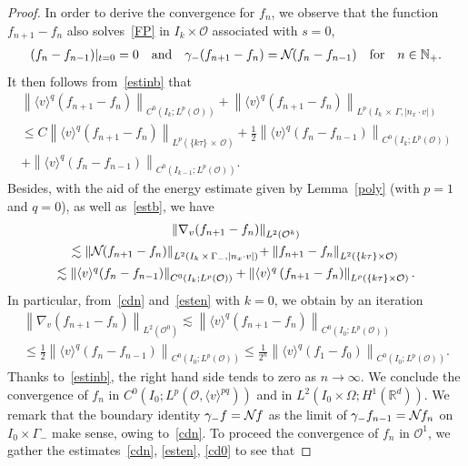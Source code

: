 \documentclass[AHL,Unicode,longabstracts,published]{cedram}
\newcommand*\N {\mathbb{N}}
\newcommand*\R {\mathbb{R}}
\newcommand*\NN {{\mathcal{N}\hspace{-.3mm}}}
\newcommand*\OO {\mathcal{O}}
\newcommand{\lv}{\langle v\rangle}
\begin{document}
\begin{proof}
In order to derive the convergence for $f_n$, we observe that the function $f_{n+1}-f_n$ also solves~\eqref{FP} in $I_k\times\OO$ associated with $s=0$,
\begin{align*}
(f_{n}-f_{n-1})|_{t=0}=0 \quad\text{and}\quad
\gamma_-(f_{n+1}-f_n)=\NN (f_{n}-f_{n-1})\quad\text{for}\quad n\in\N_+.
\end{align*}
It then follows from~\eqref{estinb} that
\begin{multline}\label{cdn}
\left\|\lv^{q}\left(f_{n+1}-f_{n}\right)\right\|_{C^0\left(I_k;L^p(\OO)\right)} + \left\|\lv^q \left(f_{n+1}-f_{n}\right)\right\|_{L^p\left(I_k\,\times\,\Gamma,|n_x\cdot v|\right)}\\
\le C\left\|\lv^{q}\left(f_{n+1}-f_{n}\right)\right\|_{L^p\left(\{k\tau\}\,\times\,\OO\right)} +\frac{1}{2}\left\|\lv^{q} \left(f_{n}-f_{n-1}\right)\right\|_{C^0\left(I_k;L^p(\OO)\right)}\\
+ \left\|\lv^{q} \left(f_{n}-f_{n-1}\right)\right\|_{C^0\left(I_{k-1};L^p(\OO)\right)}.
\end{multline}
Besides, with the aid of the energy estimate given by Lemma~\ref{poly} (with $p=1$ and $q=0$), as well as~\eqref{estb}, we have
\begin{multline}\label{esten}
\left\|\nabla_v(f_{n+1}-f_{n})\right\|_{L^2\left(\OO^k\right)} \\
\!\lesssim \left\|\NN(f_{n+1}-f_{n})\right\|_{L^2\left(I_k\,\times\,\Gamma_-,|n_x\cdot v|\right)}\! +\left\|f_{n+1}-f_{n}\right\|_{L^2(\{k\tau\}\times\OO)}\\
\lesssim \left\|\lv^q(f_{n}-f_{n-1})\right\|_{C^0\left(I_k;L^p(\OO)\right)} +\left\|\lv^{q}\left(f_{n+1}-f_{n}\right)\right \|_{L^p\left(\{k\tau\}\times\OO\right)}.
\end{multline}
In particular, from~\eqref{cdn} and~\eqref{esten} with $k=0$, we obtain by an iteration
\begin{multline}\label{cd0}
\left\|\nabla_v(f_{n+1}-f_{n})\right\|_{L^2(\OO^0)}
\lesssim \left\|\lv^{q}(f_{n+1}-f_{n})\right\|_{C^0\left(I_0;L^p(\OO)\right)} \\
\le\frac{1}{2}\left\|\lv^{q} (f_{n}-f_{n-1})\right\|_{C^0\left(I_0;L^p(\OO)\right)}
\le\frac{1}{2^n}\left\|\lv^{q} (f_{1}-f_{0})\right\|_{C^0(I_0;L^p(\OO))}.
\end{multline}
Thanks to~\eqref{estinb}, the right hand side tends to zero as $n\rightarrow\infty$. We conclude the convergence of $f_n$ in $C^0(I_0;L^p(\OO,\lv^{pq}))$ and in $L^2(I_0\times\Omega;H^1(\R^d))$. We remark that the boundary identity $\gamma_-f=\NN f$ as the limit of $\gamma_-f_{n-1}=\NN f_n$ on $I_0\times\Gamma_-$ make sense, owing to~\eqref{cdn}. To proceed the convergence of $f_n$ in $\OO^1$, we gather the estimates~\eqref{cdn}, \eqref{esten}, \eqref{cd0} to see that

\end{proof}
\end{document}
